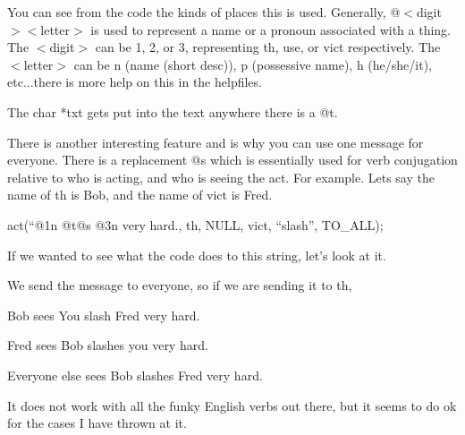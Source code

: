 You can see from the code the kinds of places this is used. Generally,
@$<$digit$>$$<$letter$>$ is used to represent a name or a pronoun
associated with a thing. The $<$digit$>$ can be 1, 2, or 3,
representing th, use, or vict respectively. The $<$letter$>$ can be n
(name (short desc)), p (possessive name), h (he/she/it), etc...there
is more help on this in the helpfiles.

The char *txt gets put into the text anywhere there is a @t. 

There is another interesting feature and is why you can use one
message for everyone. There is a replacement @s which is essentially
used for verb conjugation relative to who is acting, and who is seeing
the act. For example. Lets say the name of th is Bob, and the name of
vict is Fred.

act(``@1n @t@s @3n very hard., th, NULL, vict, ``slash'', TO\_ALL);

If we wanted to see what the code does to this string, let's look at it.

We send the message to everyone, so if we are sending it to th,

Bob sees You slash Fred very hard.


Fred sees Bob slashes you very hard.

Everyone else sees Bob slashes Fred very hard.

It does not work with all the funky English verbs out there, but it
seems to do ok for the cases I have thrown at it.


